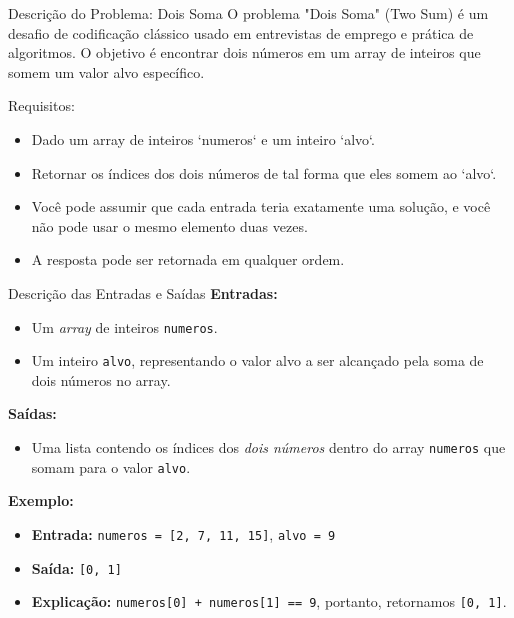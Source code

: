 \begin{frame}[fragile]{Descrição do Problema: Dois Soma}
O problema "Dois Soma" (Two Sum) é um desafio de codificação clássico 
usado em entrevistas de emprego e prática de algoritmos. O objetivo é 
encontrar dois números em um array de inteiros que somem um valor alvo 
específico.

Requisitos:
\begin{itemize}
  \item Dado um array de inteiros `numeros` e um inteiro `alvo`.
  \item Retornar os índices dos dois números de tal forma que eles somem ao `alvo`.
  \item Você pode assumir que cada entrada teria exatamente uma solução, e você não pode usar o mesmo elemento duas vezes.
  \item A resposta pode ser retornada em qualquer ordem.
\end{itemize}

\end{frame}
\begin{frame}{Descrição das Entradas e Saídas}
  \textbf{Entradas:}
  \begin{itemize}
      \item Um \textit{array} de inteiros \texttt{numeros}.
      \item Um inteiro \texttt{alvo}, representando o valor alvo a ser alcançado pela soma de dois números no array.
  \end{itemize}
  
  \textbf{Saídas:}
  \begin{itemize}
      \item Uma lista contendo os índices dos \textit{dois números} dentro do array \texttt{numeros} que somam para o valor \texttt{alvo}.
  \end{itemize}
  
  \textbf{Exemplo:}
  \begin{itemize}
      \item \textbf{Entrada:} \texttt{numeros = [2, 7, 11, 15]}, \texttt{alvo = 9}
      \item \textbf{Saída:} \texttt{[0, 1]}
      \item \textbf{Explicação:} \texttt{numeros[0] + numeros[1] == 9}, portanto, retornamos \texttt{[0, 1]}.
  \end{itemize}
\end{frame}
